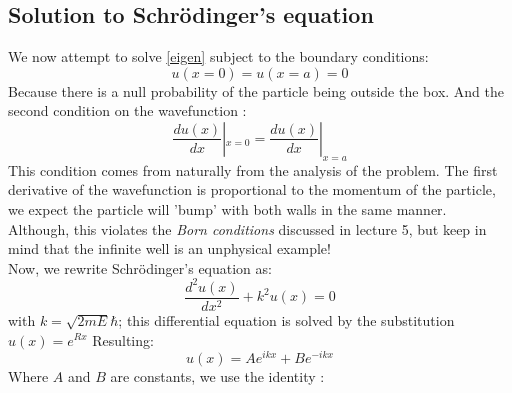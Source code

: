 \subsection{Solution to Schr\"{o}dinger's equation}
We now attempt to solve \eqref{eigen} subject to the boundary conditions:
\begin{equation}
u (x= 0) = u(x=a) = 0
\end{equation}
Because there is a null probability of the particle being outside the box. And the second condition on the wavefunction :
\begin{equation}
\frac{d u(x)}{dx} |_{x = 0} = \frac{d u(x)}{dx}|_{x = a}
\end{equation}
This condition comes from naturally from the analysis of the problem. The first derivative of the wavefunction is proportional to the momentum of the particle, we expect the particle will 'bump' with both walls in the same manner. Although, this  violates the \textit{Born conditions } discussed in lecture 5, but keep in mind that the infinite well is an unphysical example!\\
Now, we rewrite Schr\"{o}dinger's equation as:
\begin{equation}
\frac{d^ 2 u(x)}{dx^ 2}+ k^ 2 u(x) =0
\end{equation}
with $ k = \sqrt{2mE}\hbar $; this differential equation is solved by the substitution $ u (x)= e^{Rx}$ Resulting:
\begin{equation}
u(x) = A e^ {ikx} + Be^{-ikx}
\end{equation}
Where $ A$ and $ B$ are constants, we use the identity :

